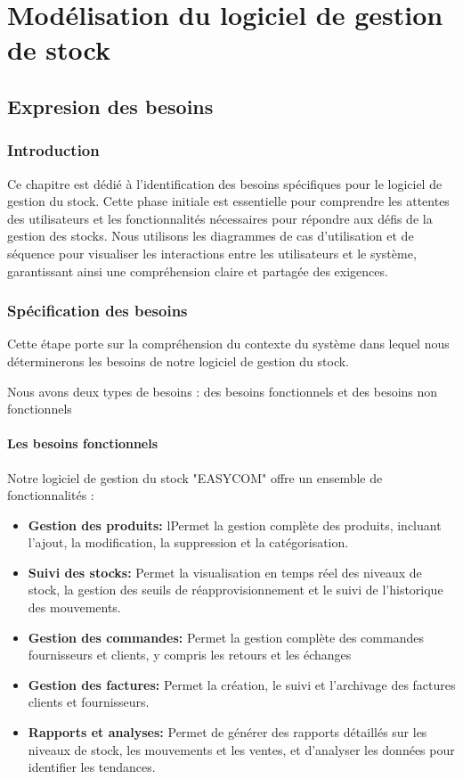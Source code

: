 \documentclass[edit,12pt,a4paper,ChapStyle,oneside,doubleinterligne]{report}
\begin{document}
\part{Modélisation du logiciel de gestion de stock}

\chapter{Expresion des besoins}
\section{Introduction}
Ce chapitre est dédié à l'identification des besoins spécifiques pour le logiciel de gestion du stock. Cette phase initiale est essentielle pour comprendre les attentes des utilisateurs et les fonctionnalités nécessaires pour répondre aux défis de la gestion des stocks. Nous utilisons les diagrammes de cas d'utilisation et de séquence pour visualiser les interactions entre les utilisateurs et le système, garantissant ainsi une compréhension claire et partagée des exigences.
\section{Spécification des besoins}
Cette étape porte sur la compréhension du contexte du système dans lequel nous déterminerons les besoins de notre logiciel de gestion du stock.

Nous avons deux types de besoins : des besoins fonctionnels et des besoins non fonctionnels

\subsection{Les besoins fonctionnels }
Notre logiciel de gestion du stock "EASYCOM" offre un ensemble de fonctionnalités :
\begin{itemize}
    \item \textbf{Gestion des produits: }lPermet la gestion complète des produits, incluant l'ajout, la modification, la suppression et la catégorisation.
    \item \textbf{Suivi des stocks: }Permet la visualisation en temps réel des niveaux de stock, la gestion des seuils de réapprovisionnement et le suivi de l'historique des mouvements.
    \item \textbf{Gestion des commandes: }Permet la gestion complète des commandes fournisseurs et clients, y compris les retours et les échanges
    \item \textbf{Gestion des factures: }Permet la création, le suivi et l'archivage des factures clients et fournisseurs.
    \item \textbf{Rapports et analyses: }Permet de générer des rapports détaillés sur les niveaux de stock, les mouvements et les ventes, et d'analyser les données pour identifier les tendances.
\end{itemize}
\end{document}
